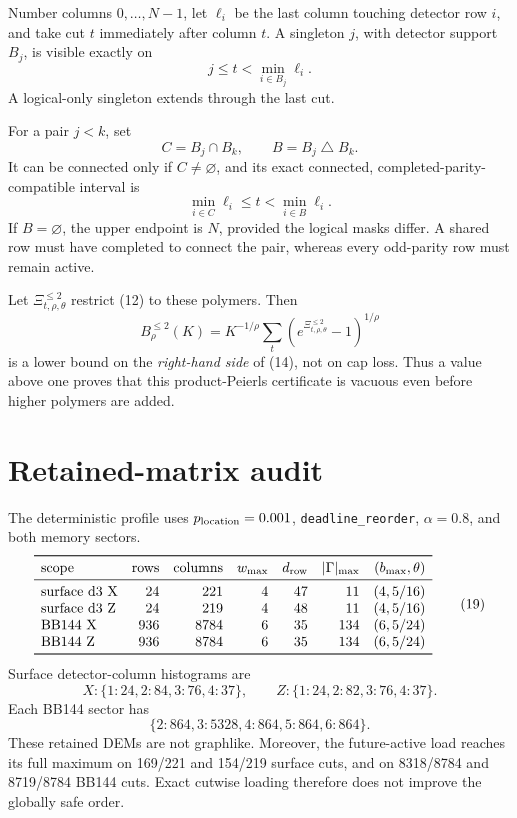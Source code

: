 \documentclass[11pt]{article}
\newcommand{\1}{\mathbf 1}
\begin{document}
Number columns \(0,\ldots,N-1\), let \(\ell_i\) be the last column touching
detector row \(i\), and take cut \(t\) immediately after column \(t\).  A
singleton \(j\), with detector support \(B_j\), is visible exactly on
\[
 j\le t<\min_{i\in B_j}\ell_i.
\tag{16}
\]
A logical-only singleton extends through the last cut.

For a pair \(j<k\), set
\[
 C=B_j\cap B_k,\qquad B=B_j\mathbin\triangle B_k.
\]
It can be connected only if \(C\ne\varnothing\), and its exact connected,
completed-parity-compatible interval is
\[
 \min_{i\in C}\ell_i
 \le t<
 \min_{i\in B}\ell_i.
\tag{17}
\]
If \(B=\varnothing\), the upper endpoint is \(N\), provided the logical
masks differ.  A shared row must have completed to connect the pair, whereas
every odd-parity row must remain active.

Let \(\Xi^{\le2}_{t,\rho,\theta}\) restrict (12) to these polymers.  Then
\[
 B^{\le2}_\rho(K)
 =
 K^{-1/\rho}
 \sum_t
 (e^{\Xi^{\le2}_{t,\rho,\theta}}-1)^{1/\rho}
\tag{18}
\]
is a lower bound on the \emph{right-hand side} of (14), not on cap loss.
Thus a value above one proves that this product-Peierls certificate is
vacuous even before higher polymers are added.

\section{Retained-matrix audit}

The deterministic profile uses \(p_{\rm location}=0.001\),
\texttt{deadline\_reorder}, \(\alpha=0.8\), and both memory sectors.
\[
\begin{array}{lrrrrrr}
\toprule
\text{scope} & \text{rows} & \text{columns} & w_{\max} & d_{\rm row}
& |\Gamma|_{\max} & (b_{\max},\theta)\\
\midrule
\text{surface d3 X} &24&221&4&47&11&(4,5/16)\\
\text{surface d3 Z} &24&219&4&48&11&(4,5/16)\\
\text{BB144 X} &936&8784&6&35&134&(6,5/24)\\
\text{BB144 Z} &936&8784&6&35&134&(6,5/24)\\
\bottomrule
\end{array}
\tag{19}
\]
Surface detector-column histograms are
\[
 X:\{1:24,2:84,3:76,4:37\},\qquad
 Z:\{1:24,2:82,3:76,4:37\}.
\]
Each BB144 sector has
\[
 \{2:864,3:5328,4:864,5:864,6:864\}.
\]
These retained DEMs are not graphlike.  Moreover, the future-active load
reaches its full maximum on 169/221 and 154/219 surface cuts, and on
8318/8784 and 8719/8784 BB144 cuts.  Exact cutwise loading therefore does
not improve the globally safe order.
\end{document}
